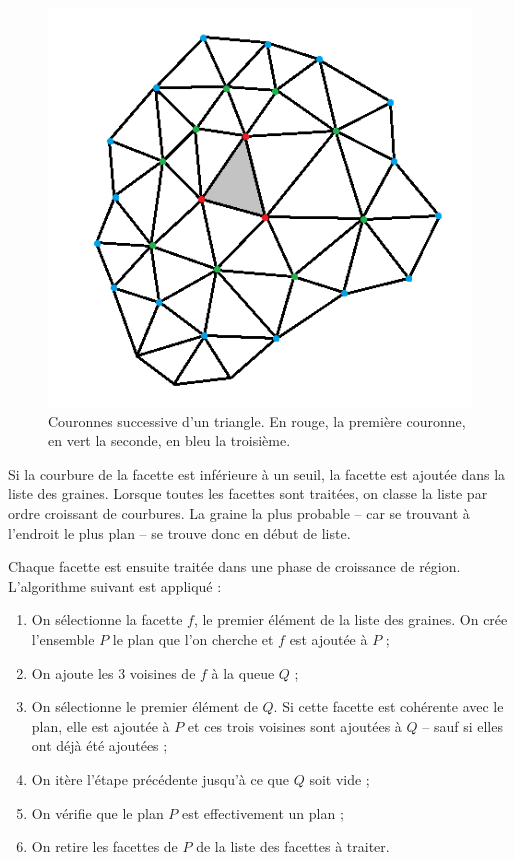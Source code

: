 ﻿\documentclass[12pt, twoside]{article}
\begin{document}
\begin{figure}[h]
\centering
\includegraphics[scale=0.5]{Couronnes.png}
\caption{\label{fig:couronne} Couronnes successive d'un triangle. En rouge, la première couronne, en vert la seconde, en bleu la troisième.}
\end{figure}

Si la courbure de la facette est inférieure à un seuil, la facette est ajoutée dans la liste des graines. Lorsque toutes les facettes sont traitées, on classe la liste par ordre croissant de courbures. La graine la plus probable -- car se trouvant à l'endroit le plus plan -- se trouve donc en début de liste.

Chaque facette est ensuite traitée dans une phase de croissance de région. L'algorithme suivant est appliqué :
\begin{enumerate}
  \item On sélectionne la facette $f$, le premier élément de la liste des graines. On crée l'ensemble $P$ le plan que l'on cherche et $f$ est ajoutée à $P$ ;
  \item On ajoute les 3 voisines de $f$ à la queue $Q$ ;
  \item On sélectionne le premier élément de $Q$. Si cette facette est cohérente avec le plan, elle est ajoutée à $P$ et ces trois voisines sont ajoutées à $Q$ -- sauf si elles ont déjà été ajoutées ;
  \item On itère l'étape précédente jusqu'à ce que $Q$ soit vide ;
  \item On vérifie que le plan $P$ est effectivement un plan ;
  \item On retire les facettes de $P$ de la liste des facettes à traiter.
\end{enumerate}
\end{document}
